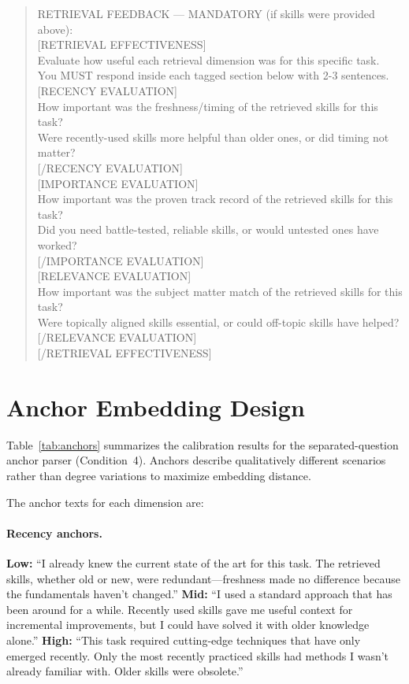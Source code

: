 \begin{quote}
\small\ttfamily\raggedright\noindent
RETRIEVAL FEEDBACK --- MANDATORY (if skills were provided above):\\{}
[RETRIEVAL EFFECTIVENESS]\\{}
Evaluate how useful each retrieval dimension was for this specific task.\\{}
You MUST respond inside each tagged section below with 2-3 sentences.\\[\medskipamount]
[RECENCY EVALUATION]\\{}
How important was the freshness/timing of the retrieved skills for this task?\\{}
Were recently-used skills more helpful than older ones, or did timing not matter?\\{}
[/RECENCY EVALUATION]\\[\medskipamount]
[IMPORTANCE EVALUATION]\\{}
How important was the proven track record of the retrieved skills for this task?\\{}
Did you need battle-tested, reliable skills, or would untested ones have worked?\\{}
[/IMPORTANCE EVALUATION]\\[\medskipamount]
[RELEVANCE EVALUATION]\\{}
How important was the subject matter match of the retrieved skills for this task?\\{}
Were topically aligned skills essential, or could off-topic skills have helped?\\{}
[/RELEVANCE EVALUATION]\\{}
[/RETRIEVAL EFFECTIVENESS]
\end{quote}

\section{Anchor Embedding Design}
\label{app:anchors}

Table~\ref{tab:anchors} summarizes the calibration results for the separated-question anchor parser (Condition~4).
Anchors describe qualitatively different scenarios rather than degree variations to maximize embedding distance.

The anchor texts for each dimension are:

\paragraph{Recency anchors.}
\textbf{Low:} ``I already knew the current state of the art for this task. The retrieved skills, whether old or new, were redundant---freshness made no difference because the fundamentals haven't changed.''
\textbf{Mid:} ``I used a standard approach that has been around for a while. Recently used skills gave me useful context for incremental improvements, but I could have solved it with older knowledge alone.''
\textbf{High:} ``This task required cutting-edge techniques that have only emerged recently. Only the most recently practiced skills had methods I wasn't already familiar with. Older skills were obsolete.''

